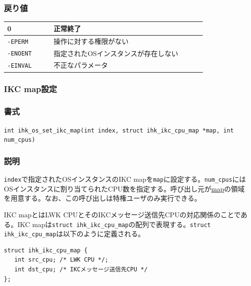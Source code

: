 \documentclass[twoside,11pt,fleqn]{book}
\newcommand\textttw[1]{\mathchardef\UrlBreakPenalty=100\mathchardef\UrlBigBreakPenalty=100\url{#1}}
\begin{document}
\subsubsection*{戻り値}
\begin{table}[!h]
\footnotesize
\begin{tabular}{|p{0.20\linewidth}|p{0.66\linewidth}|} \hline
0&正常終了\\ \hline
\texttt{-EPERM}&操作に対する権限がない\\ \hline
\texttt{-ENOENT}&指定されたOSインスタンスが存在しない\\ \hline
\texttt{-EINVAL}&不正なパラメータ\\ \hline
\end{tabular}
\vspace{-0em}
\end{table}
\FloatBarrier

\subsubsection{IKC map設定}
\subsubsection*{書式}{\quad} \texttt{int ihk\_os\_set\_ikc\_map(int index, struct ihk\_ikc\_cpu\_map *map, int num\_cpus)}
\subsubsection*{説明}{\quad} \texttt{index}で指定されたOSインスタンスのIKC mapを\texttt{map}に設定する。\texttt{num\_cpus}にはOSインスタンスに割り当てられたCPU数を指定する。呼び出し元が\textttw{map}の領域を用意する。なお、この呼び出しは特権ユーザのみ実行できる。

IKC mapとはLWK CPUとそのIKCメッセージ送信先CPUの対応関係のことである。IKC mapは\texttt{struct ihk\_ikc\_cpu\_map}の配列で表現する。\texttt{struct ihk\_ikc\_cpu\_map}は以下のように定義される。
\begin{verbatim}
struct ihk_ikc_cpu_map {
   int src_cpu; /* LWK CPU */;
   int dst_cpu; /* IKCメッセージ送信先CPU */
};
\end{verbatim}
\end{document}
